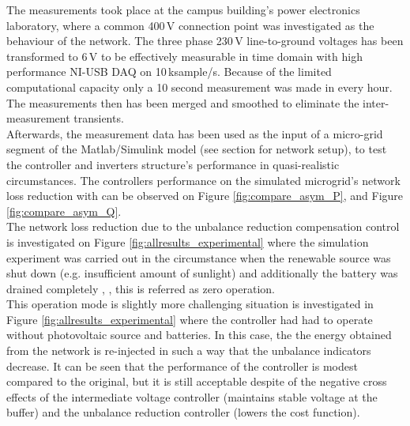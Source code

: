             The measurements took place at the campus building's power electronics laboratory, where a common 400\,V connection point was investigated as the behaviour of the network. The three phase 230\,V line-to-ground voltages has been transformed to 6\,V to be effectively measurable in time domain with high performance NI-USB DAQ on 10\,ksample/s. Because of the limited computational capacity only a 10 second measurement was made in every hour.  The measurements then has been merged and smoothed to eliminate the inter-measurement transients.\\
            Afterwards, the measurement data has been used as the input of a micro-grid segment of the Matlab/Simulink model (see section  for network setup), to test the controller and inverters structure's performance in quasi-realistic circumstances. The controllers performance on the simulated microgrid's network loss reduction with can be observed on Figure \ref{fig:compare_asym_P}, and Figure \ref{fig:compare_asym_Q}.\\
            The network loss reduction due to the unbalance reduction compensation control is investigated on Figure \ref{fig:allresults_experimental} where the simulation experiment was carried out in the circumstance when the renewable source was shut down (e.g. insufficient amount of sunlight) and additionally the battery was drained completely  \cite{Neukirchner2015}, \cite{neukirchner2015examination}, this is referred as zero operation.\\
            This operation mode is slightly more challenging situation is investigated in Figure \ref{fig:allresults_experimental} where the controller had had to operate without photovoltaic source and batteries. In this case, the the energy obtained from the network is re-injected in such a way that the unbalance indicators decrease. It can be seen that the performance of the controller is modest compared to the original, but it is still acceptable despite of the negative cross effects of the intermediate voltage controller (maintains stable voltage at the buffer) and the unbalance reduction controller (lowers the cost function).
            
